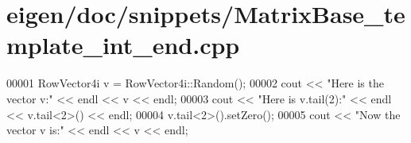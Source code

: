 \hypertarget{eigen_2doc_2snippets_2_matrix_base__template__int__end_8cpp_source}{}\section{eigen/doc/snippets/\+Matrix\+Base\+\_\+template\+\_\+int\+\_\+end.cpp}
\label{eigen_2doc_2snippets_2_matrix_base__template__int__end_8cpp_source}

\begin{DoxyCode}
00001 RowVector4i v = RowVector4i::Random();
00002 cout << \textcolor{stringliteral}{"Here is the vector v:"} << endl << v << endl;
00003 cout << \textcolor{stringliteral}{"Here is v.tail(2):"} << endl << v.tail<2>() << endl;
00004 v.tail<2>().setZero();
00005 cout << \textcolor{stringliteral}{"Now the vector v is:"} << endl << v << endl;
\end{DoxyCode}
